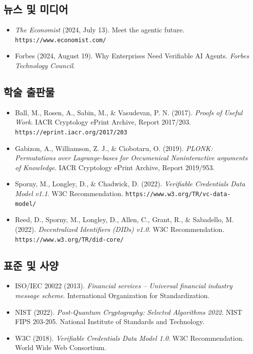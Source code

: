 \documentclass[11pt]{article}
\begin{document}
\subsection*{뉴스 및 미디어}

\begin{itemize}[leftmargin=*, label={}]
  \item \textit{The Economist} (2024, July 13). Meet the agentic future. \texttt{https://www.economist.com/}

  \item Forbes (2024, August 19). Why Enterprises Need Verifiable AI Agents. \textit{Forbes Technology Council}.
\end{itemize}

\subsection*{학술 출판물}

\begin{itemize}[leftmargin=*, label={}]
  \item Ball, M., Rosen, A., Sabin, M., \& Vasudevan, P. N. (2017). \textit{Proofs of Useful Work}. IACR Cryptology ePrint Archive, Report 2017/203. \texttt{https://eprint.iacr.org/2017/203}

  \item Gabizon, A., Williamson, Z. J., \& Ciobotaru, O. (2019). \textit{PLONK: Permutations over Lagrange-bases for Oecumenical Noninteractive arguments of Knowledge}. IACR Cryptology ePrint Archive, Report 2019/953.

  \item Sporny, M., Longley, D., \& Chadwick, D. (2022). \textit{Verifiable Credentials Data Model v1.1}. W3C Recommendation. \texttt{https://www.w3.org/TR/vc-data-model/}

  \item Reed, D., Sporny, M., Longley, D., Allen, C., Grant, R., \& Sabadello, M. (2022). \textit{Decentralized Identifiers (DIDs) v1.0}. W3C Recommendation. \texttt{https://www.w3.org/TR/did-core/}
\end{itemize}

\subsection*{표준 및 사양}

\begin{itemize}[leftmargin=*, label={}]
  \item ISO/IEC 20022 (2013). \textit{Financial services -- Universal financial industry message scheme}. International Organization for Standardization.

  \item NIST (2022). \textit{Post-Quantum Cryptography: Selected Algorithms 2022}. NIST FIPS 203-205. National Institute of Standards and Technology.

  \item W3C (2018). \textit{Verifiable Credentials Data Model 1.0}. W3C Recommendation. World Wide Web Consortium.
\end{itemize}
\end{document}
